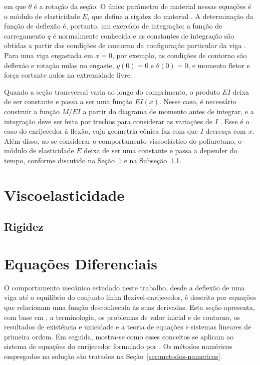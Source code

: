 \documentclass[arial,centeredequations,english,brazilian,oneside,section=TITLE]{ifes8}
\begin{document}
em que $\theta$ é a rotação da seção. O único parâmetro de material nessas equações é o
módulo de elasticidade $E$, que define a rigidez do material \cite{Norton2013}.
A determinação da função de deflexão é, portanto, um exercício de integração: a função
de carregamento $q$ é normalmente conhecida e as constantes de integração são obtidas
a partir das condições de contorno da configuração particular da viga
\cite{Norton2013}. Para uma viga engastada em $x = 0$, por exemplo, as
condições de contorno são deflexão e rotação nulas no engaste, $y(0) = 0$ e
$\theta(0) = 0$, e momento fletor e força cortante nulos na extremidade livre.

Quando a seção transversal varia ao longo do comprimento, o produto $E I$ deixa de
ser constante e passa a ser uma função $E I(x)$. Nesse caso, é necessário construir
a função $M/EI$ a partir do diagrama de momento antes de integrar, e a integração
deve ser feita por trechos para considerar as variações de $I$
\cite{Norton2013}. Esse é o caso do enrijecedor à flexão, cuja geometria
cônica faz com que $I$ decresça com $x$. Além disso, ao se considerar o
comportamento viscoelástico do poliuretano, o módulo de elasticidade $E$ deixa de ser
uma constante e passa a depender do tempo, conforme discutido na
Seção~\ref{sec:viscoelasticidade} e na Subseção~\ref{sub:rigidez}.


\section{Viscoelasticidade}
\label{sec:viscoelasticidade}

\subsection{Rigidez}
\label{sub:rigidez}


\section{Equações Diferenciais}
\label{sec:equacoes-diferenciais}

O comportamento mecânico estudado neste trabalho, desde a deflexão de uma viga até o
equilíbrio do conjunto linha flexível-enrijecedor, é descrito por equações que
relacionam uma função desconhecida às suas derivadas. Esta seção apresenta, com base em
, a terminologia, os problemas de valor inicial e de
contorno, os resultados de existência e unicidade e a teoria de equações e sistemas
lineares de primeira ordem. Em seguida, mostra-se como esses conceitos se aplicam ao
sistema de equações do enrijecedor formulado por . Os
métodos numéricos empregados na solução são tratados na
Seção~\ref{sec:metodos-numericos}.
 
\end{document}
